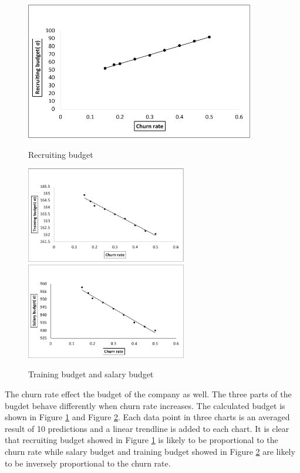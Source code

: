 \documentclass[12pt,a4paper,titlepage]{article}
\begin{document}
\begin{figure}[htb]
  \centering
  \includegraphics[width=10cm]{task4_r.pdf}\\
  \caption{Recruiting budget}\label{t4_r}
\end{figure}
\begin{figure}[htb]
  \centering
  \includegraphics[width=7cm]{task4_t.pdf}
  \includegraphics[width=7cm]{task4_s.pdf}\\
  \caption{Training budget and salary budget}\label{t4_t_s}
\end{figure}
The churn rate effect the budget of the company as well. The three
parts of the bugdet behave differently when churn rate increases. The
calculated budget is shown in Figure \ref{t4_r} and Figure
\ref{t4_t_s}. Each data point in three charts is an averaged result of
10 predictions and a linear trendline is added to each chart. It is
clear that recruiting budget showed in Figure \ref{t4_r} is likely to
be proportional to the churn rate while salary budget and training
budget showed in Figure \ref{t4_t_s} are likely to be inversely
proportional to the churn rate.
\end{document}

